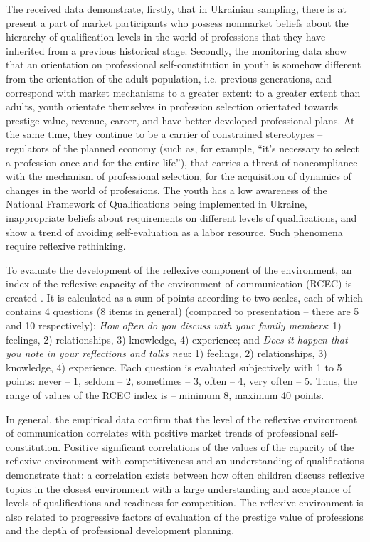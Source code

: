 \documentclass[conference]{IEEEtran}
\begin{document}
\begin{enumerate}
	The received data demonstrate, firstly, that in Ukrainian sampling, there is at present a part of market participants who possess nonmarket beliefs about the hierarchy of qualification levels in the world of professions that they have inherited from a previous historical stage. Secondly, the monitoring data show that an orientation on professional self-constitution in youth is somehow different from the orientation of the adult population, i.e. previous generations, and correspond with market mechanisms to a greater extent: to a greater extent than adults, youth orientate themselves in profession selection orientated towards prestige value, revenue, career, and have better developed professional plans. At the same time, they continue to be a carrier of constrained stereotypes – regulators of the planned economy (such as, for example, “it’s necessary to select a profession once and for the entire life”), that carries a threat of noncompliance with the mechanism of professional selection, for the acquisition of dynamics of changes in the world of professions. The youth has a low awareness of the National Framework of Qualifications being implemented in Ukraine, inappropriate beliefs about requirements on different levels of qualifications, and show a trend of avoiding self-evaluation as a labor resource. Such phenomena require reflexive rethinking.
	
	To evaluate the development of the reflexive component of the environment, an index of the reflexive capacity of the environment of communication (RCEC) is created \cite{b10,b14,b9,b15,b13}. It is calculated as a sum of points according to two scales, each of which contains 4 questions (8 items in general) (compared to presentation – there are 5 and 10 respectively): \textit{How often do you discuss with your family members}: 1) feelings, 2) relationships, 3) knowledge, 4) experience; and \textit{Does it happen that you note in your reflections and talks new}: 1) feelings, 2) relationships, 3) knowledge, 4) experience. Each question is evaluated subjectively with 1 to 5 points: never – 1, seldom – 2, sometimes – 3, often – 4, very often – 5. Thus, the range of values of the RCEC index is – minimum 8, maximum 40 points.
	
	In general, the empirical data confirm that the level of the reflexive environment of communication correlates with positive market trends of professional self-constitution. Positive significant correlations of the values of the capacity of the reflexive environment with competitiveness and an understanding of qualifications demonstrate that: a correlation exists between how often children discuss reflexive topics in the closest environment with a large understanding and acceptance of levels of qualifications and readiness for competition. The reflexive environment is also related to progressive factors of evaluation of the prestige value of professions and the depth of professional development planning.
	

\end{enumerate}
\end{document}
